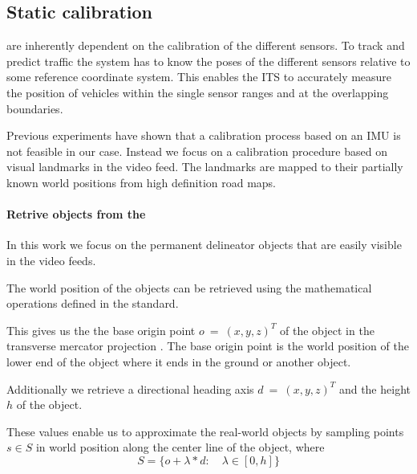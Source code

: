 
\subsection{Static calibration}
\label{sec:static_calibration_approach}

\ITS{} are inherently dependent on the calibration of the different sensors. 
To track and predict traffic the system has to know the poses of the different sensors relative to some reference coordinate system.
This enables the ITS to accurately measure the position of vehicles within the single sensor ranges and at the overlapping boundaries.

Previous experiments have shown that a calibration process based on an IMU is not feasible in our case. 
Instead we focus on a calibration procedure based on visual landmarks in the video feed.
The landmarks are mapped to their partially known world positions from high definition road maps. 


\paragraph{Retrive objects from the \HDmaps}
In this work we focus on the permanent delineator objects that are easily visible in the video feeds.

The world position of the objects can be retrieved using the mathematical operations defined in the \OD{} standard.

This gives us the the base origin point $o~=~(x, y, z)^T$ of the object in the transverse mercator projection \cite{proj}. 
The base origin point is the world position of the lower end of the object where it ends in the ground or another object.

Additionally we retrieve a directional heading axis $d~=~(x, y, z)^T$ and the height $h$ of the object.

These values enable us to approximate the real-world objects by sampling points $s \in S$ in world position along the center line of the object, where 
\begin{equation}
S = \{o + \lambda * d: \quad \lambda \in [0, h]\}
\end{equation}

